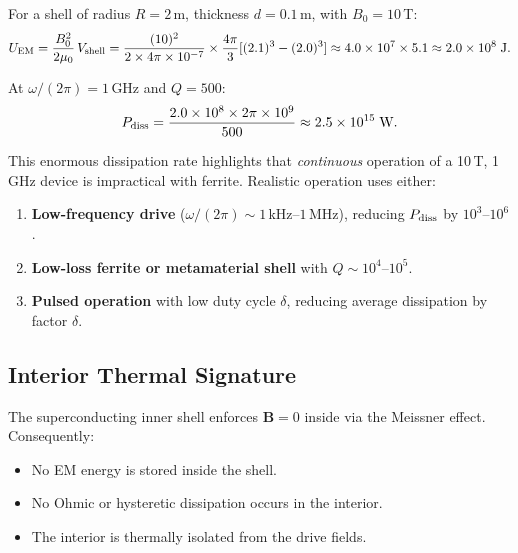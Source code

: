 \documentclass[11pt]{article}
\begin{document}
For a shell of radius $R = 2$\,m, thickness $d = 0.1$\,m, with
$B_0 = 10$\,T:
\begin{equation}
U_{\rm EM} = \frac{B_0^2}{2\mu_0}\,V_{\rm shell}
  = \frac{(10)^2}{2 \times 4\pi \times 10^{-7}}
  \times \frac{4\pi}{3}[(2.1)^3 - (2.0)^3]
  \approx 4.0 \times 10^7 \times 5.1
  \approx 2.0 \times 10^8\;\text{J}.
\end{equation}

At $\omega/(2\pi) = 1$\,GHz and $Q = 500$:
\begin{equation}
P_{\rm diss} = \frac{2.0 \times 10^8 \times 2\pi \times 10^9}{500}
  \approx 2.5 \times 10^{15}\;\text{W}.
\end{equation}

This enormous dissipation rate highlights that \emph{continuous} operation
of a 10\,T, 1\,GHz device is impractical with ferrite. Realistic
operation uses either:
\begin{enumerate}[noitemsep]
\item \textbf{Low-frequency drive} ($\omega/(2\pi) \sim 1$\,kHz--$1$\,MHz),
  reducing $P_{\rm diss}$ by $10^3$--$10^6$.
\item \textbf{Low-loss ferrite or metamaterial shell} with $Q \sim 10^4$--$10^5$.
\item \textbf{Pulsed operation} with low duty cycle $\delta$, reducing
  average dissipation by factor $\delta$.
\end{enumerate}

\subsection{Interior Thermal Signature}

The superconducting inner shell enforces $\mathbf{B} = 0$ inside via the
Meissner effect. Consequently:
\begin{itemize}[noitemsep]
\item No EM energy is stored inside the shell.
\item No Ohmic or hysteretic dissipation occurs in the interior.
\item The interior is thermally isolated from the drive fields.
\end{itemize}
\end{document}
